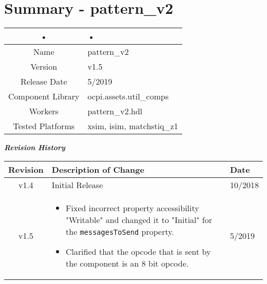 \documentclass{article}
\author{} %
\date{Version \docVersion} %
\title{\docTitle}
\def\comp{pattern\_v2}
\begin{document}
\section*{Summary - \comp}
	\begin{tabular}{|c|M{13.5cm}|}
		\hline
		• & • \\
		\hline
		Name & \comp \\
		\hline
		Version & v1.5 \\
		\hline
		Release Date & 5/2019 \\
		\hline
		Component Library & ocpi.assets.util\_comps \\
		\hline
		Workers & \comp.hdl \\
		\hline
		Tested Platforms & xsim, isim, matchstiq\_z1 \\
		\hline
	\end{tabular}
	
	\begin{center}
	\textit{\textbf{Revision History}}
		\begin{table}[H]
		\label{table:revisions} %
			\begin{tabularx}{\textwidth}{|c|X|l|}
			\hline
			\rowcolor{blue}
			\textbf{Revision} & \textbf{Description of Change} & \textbf{Date} \\
		    \hline
		    v1.4 & Initial Release & 10/2018 \\
		    \hline
        v1.5 & \begin{itemize} \item Fixed incorrect property accessibility "Writable" and changed it to "Initial" for the \texttt{messagesToSend} property. \item Clarified that the opcode that is sent by the component is an 8 bit opcode. \end{itemize} & 5/2019 \\
		    \hline
			\end{tabularx}
		\end{table}
	\end{center}
	
\end{document}
